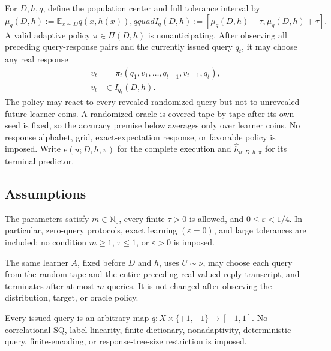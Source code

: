 For $D,h,q$, define the population center and full tolerance interval by
\[
\mu_q(D,h):=\mathbb E_{x\sim D}q(x,h(x)),qquad
I_q(D,h):=[\mu_q(D,h)-\tau,\mu_q(D,h)+\tau].
\]
A valid adaptive policy $\pi\in\Pi(D,h)$ is nonanticipating.  After observing
all preceding query-response pairs and the currently issued query $q_t$, it
may choose any real response
\[
\begin{aligned}
v_t&=\pi_t(q_1,v_1,\ldots,q_{t-1},v_{t-1},q_t),\\
v_t&\in I_{q_t}(D,h).
\end{aligned}
\]
The policy may react to every revealed randomized query but not to unrevealed
future learner coins.  A randomized oracle is covered tape by tape after its
own seed is fixed, so the accuracy premise below averages only over learner
coins.  No response alphabet, grid, exact-expectation response, or favorable
policy is imposed.  Write $e(u;D,h,\pi)$ for the complete execution and
$\widehat h_{u;D,h,\pi}$ for its terminal predictor.

\subsection{Assumptions}

\begin{assumption}
\label{assump:source-parameter-regime}
The parameters satisfy $m\in\mathbb N_0$, every finite $\tau>0$ is allowed,
and $0\le\varepsilon<1/4$.  In particular, zero-query protocols, exact
learning $(\varepsilon=0)$, and large tolerances are included; no condition
$m\ge1$, $\tau\le1$, or $\varepsilon>0$ is imposed.
\end{assumption}

\begin{assumption}
\label{assump:finite-horizon-randomized-adaptivity}
The same learner $A$, fixed before $D$ and $h$, uses $U\sim\nu$, may choose
each query from the random tape and the entire preceding real-valued reply
transcript, and terminates after at most $m$ queries.  It is not changed after
observing the distribution, target, or oracle policy.
\end{assumption}

\begin{assumption}
\label{assump:bounded-unrestricted-queries}
Every issued query is an arbitrary map
$q:X\times\{+1,-1\}\to[-1,1]$.  No correlational-SQ, label-linearity,
finite-dictionary, nonadaptivity, deterministic-query, finite-encoding, or
response-tree-size restriction is imposed.
\end{assumption}

